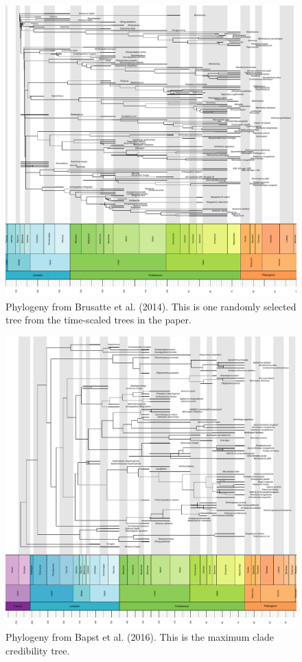 \documentclass[12pt,a4paper]{article}
\begin{document}
\begin{figure}[!htbp]
    \centering
    \includegraphics[width=1\linewidth, height=1\textheight, keepaspectratio]{figures/fig-tree-Brusatte2014-appendix.pdf}
    \caption[Brusatte2014.]
    {Phylogeny from Brusatte et al. (2014). This is one randomly selected tree from the time-scaled trees in the paper.}
    \label{figure:brusatte}
  \end{figure} 

\begin{figure}[!htbp]
    \centering
    \includegraphics[width=1\linewidth, height=1\textheight, keepaspectratio]{figures/fig-tree-Bapst2016-appendix.pdf}
    \caption[Bapst2016.]
    {Phylogeny from Bapst et al. (2016). This is the maximum clade credibility tree.}
    \label{figure:bapst}
  \end{figure} 
\end{document}
